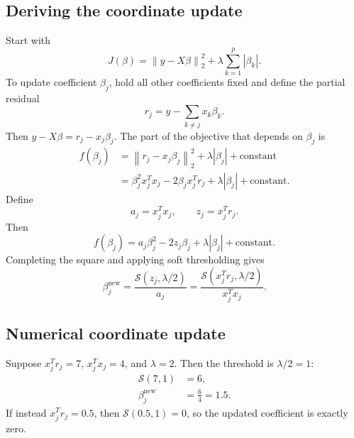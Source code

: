 \documentclass[11pt,a4paper]{article}
\numberwithin{equation}{section}
\newcommand{\norm}[1]{\left\lVert #1\right\rVert}
\newcommand{\abs}[1]{\left|#1\right|}
\newcommand{\soft}{\mathcal{S}}
\begin{document}
\subsection{Deriving the coordinate update}
Start with
\begin{equation}
  J(\beta)=\norm{y-X\beta}_2^2+\lambda\sum_{k=1}^p\abs{\beta_k}.
\end{equation}
To update coefficient $\beta_j$, hold all other coefficients fixed and define the partial residual
\begin{equation}
  \boxed{r_j=y-\sum_{k\neq j}x_k\beta_k.}
\end{equation}
Then $y-X\beta=r_j-x_j\beta_j$. The part of the objective that depends on $\beta_j$ is
\begin{align}
  f(\beta_j)&=\norm{r_j-x_j\beta_j}_2^2+\lambda\abs{\beta_j}+\text{constant}\\
  &=\beta_j^2x_j^Tx_j-2\beta_jx_j^Tr_j+\lambda\abs{\beta_j}+\text{constant}.
\end{align}
Define
\begin{equation}
  a_j=x_j^Tx_j,\qquad z_j=x_j^Tr_j.
\end{equation}
Then
\begin{equation}
  f(\beta_j)=a_j\beta_j^2-2z_j\beta_j+\lambda\abs{\beta_j}+\text{constant}.
\end{equation}
Completing the square and applying soft thresholding gives
\begin{equation}
  \boxed{\beta_j^{\mathrm{new}}=\frac{\soft(z_j,\lambda/2)}{a_j}
  =\frac{\soft(x_j^Tr_j,\lambda/2)}{x_j^Tx_j}.}
  \label{eq:coordinate-update}
\end{equation}

\subsection{Numerical coordinate update}
Suppose $x_j^Tr_j=7$, $x_j^Tx_j=4$, and $\lambda=2$. Then the threshold is $\lambda/2=1$:
\begin{align}
  \soft(7,1)&=6,\\
  \beta_j^{\mathrm{new}}&=\frac{6}{4}=1.5.
\end{align}
If instead $x_j^Tr_j=0.5$, then $\soft(0.5,1)=0$, so the updated coefficient is exactly zero.
\end{document}
